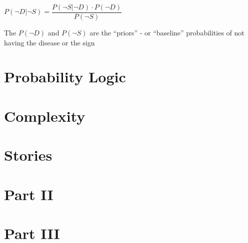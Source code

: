 \documentclass[
]{book}
\begin{document}
\(P(\neg D|\neg S)=\dfrac{P(\neg S|\neg D)\cdot P(\neg D)}{P(\neg S)}\)

The \(P(\neg D)\) and \(P(\neg S)\) are the ``priors'' - or ``baseline'' probabilities of not having the disease or the sign

\hypertarget{probability-logic}{%
\chapter{Probability Logic}\label{probability-logic}}

\hypertarget{complexity}{%
\chapter{Complexity}\label{complexity}}

\hypertarget{stories}{%
\chapter{Stories}\label{stories}}

\hypertarget{part2}{%
\chapter*{Part II}\label{part2}}

\hypertarget{part3}{%
\chapter*{Part III}\label{part3}}

  
\end{document}
